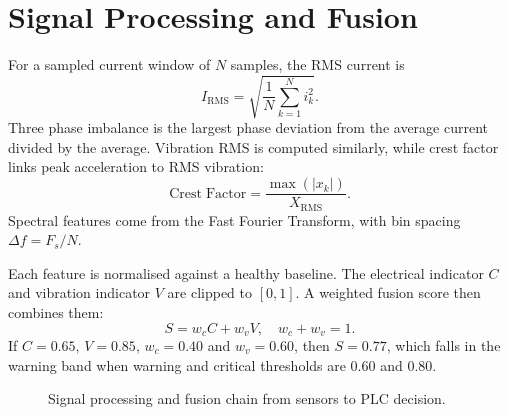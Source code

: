 \documentclass[10pt,a4paper,twocolumn]{article}
\begin{document}
\section*{Signal Processing and Fusion}
For a sampled current window of $N$ samples, the RMS current is
\begin{equation}
I_{\mathrm{RMS}} = \sqrt{\frac{1}{N}\sum_{k=1}^{N} i_k^2}.
\label{eq:irms}
\end{equation}
Three phase imbalance is the largest phase deviation from the average current divided by the average. Vibration RMS is computed similarly, while crest factor links peak acceleration to RMS vibration:
\begin{equation}
\mathrm{Crest\;Factor} = \frac{\max(|x_k|)}{X_{\mathrm{RMS}}}.
\label{eq:crest}
\end{equation}
Spectral features come from the Fast Fourier Transform, with bin spacing $\Delta f = F_s/N$.

Each feature is normalised against a healthy baseline. The electrical indicator $C$ and vibration indicator $V$ are clipped to $[0,1]$. A weighted fusion score then combines them:
\begin{equation}
S = w_c C + w_v V,\quad w_c + w_v = 1.
\label{eq:fusion}
\end{equation}
If $C=0.65$, $V=0.85$, $w_c=0.40$ and $w_v=0.60$, then $S=0.77$, which falls in the warning band when warning and critical thresholds are $0.60$ and $0.80$.

\begin{figure}[htbp]
\centering
\small
{}
\caption{Signal processing and fusion chain from sensors to PLC decision.}
\label{fig:processing}
\end{figure}
\end{document}
